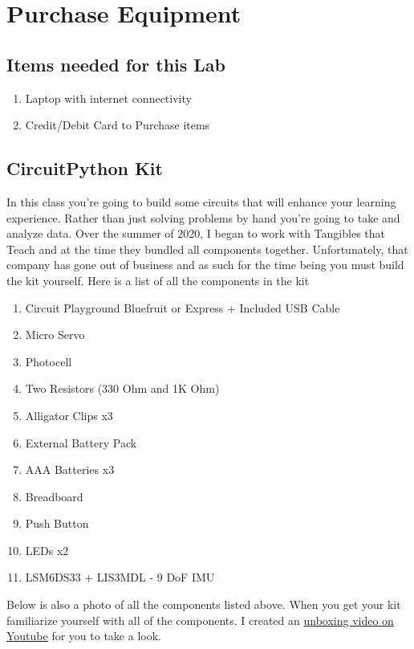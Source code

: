 \newpage

\section{Purchase Equipment}

\subsection{Items needed for this Lab}

\begin{enumerate}[itemsep=-5pt]
\item Laptop with internet connectivity
\item Credit/Debit Card to Purchase items
\end{enumerate}

\subsection{CircuitPython Kit}

In this class you’re going to build some circuits that will enhance
your learning experience. Rather than just solving problems by hand
you’re going to take and analyze data. Over the summer of 2020, I
began to work with Tangibles that Teach and at the time they bundled
all components together. Unfortunately, that company has gone out of
business and as such for the time being you must build the kit
yourself. Here is a list of all the components in the kit

\begin{enumerate}[itemsep=-5pt]
\item Circuit Playground Bluefruit or Express + Included USB Cable
\item Micro Servo
\item Photocell
\item Two Resistors (330 Ohm and 1K Ohm)
\item Alligator Clips x3
\item External Battery Pack
\item AAA Batteries x3
\item Breadboard
\item Push Button 
\item LEDs x2
\item LSM6DS33 + LIS3MDL - 9 DoF IMU
\end{enumerate}

Below is also a photo of all the components listed above. When you get
your kit familiarize yourself with all of the components. I created
an \href{https://youtu.be/6sNNQrhnzLE}{unboxing video on Youtube} 
for you to take a look. 

